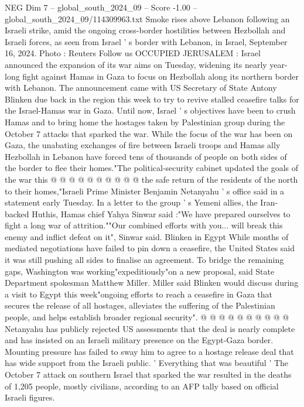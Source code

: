 \begin{textsample}{NEG Dim 7 – global\_south\_2024\_09 – Score -1.00 – global\_south\_2024\_09/114309963.txt}  \label{ex:f7_neg_220}
Smoke rises above Lebanon following an Israeli strike, amid the ongoing cross-border hostilities between Hezbollah and Israeli forces, as seen from Israel ' s border with Lebanon, in Israel, September 16, 2024.
Photo : Reuters Follow us OCCUPIED JERUSALEM : Israel announced the expansion of its war aims on Tuesday, widening its nearly year-long fight against Hamas in Gaza to focus on Hezbollah along its northern border with Lebanon.
The announcement came with US Secretary of State Antony Blinken due back in the region this week to try to revive stalled ceasefire talks for the Israel-Hamas war in Gaza.
Until now, Israel ' s objectives have been to crush Hamas and to bring home the hostages taken by Palestinian group during the October 7 attacks that sparked the war.
While the focus of the war has been on Gaza, the unabating exchanges of fire between Israeli troops and Hamas ally Hezbollah in Lebanon have forced tens of thousands of people on both sides of the border to flee their homes."The political-security cabinet updated the goals of the war this @ @ @ @ @ @ @ @ @ @ the safe return of the residents of the north to their homes,"Israeli Prime Minister Benjamin Netanyahu ' s office said in a statement early Tuesday.
In a letter to the group ' s Yemeni allies, the Iran-backed Huthis, Hamas chief Yahya Sinwar said :"We have prepared ourselves to fight a long war of attrition.""Our combined efforts with you... will break this enemy and inflict defeat on it", Sinwar said.
Blinken in Egypt While months of mediated negotiations have failed to pin down a ceasefire, the United States said it was still pushing all sides to finalise an agreement.
To bridge the remaining gaps, Washington was working"expeditiously"on a new proposal, said State Department spokesman Matthew Miller.
Miller said Blinken would discuss during a visit to Egypt this week"ongoing efforts to reach a ceasefire in Gaza that secures the release of all hostages, alleviates the suffering of the Palestinian people, and helps establish broader regional security". @ @ @ @ @ @ @ @ @ @ Netanyahu has publicly rejected US assessments that the deal is nearly complete and has insisted on an Israeli military presence on the Egypt-Gaza border.
Mounting pressure has failed to sway him to agree to a hostage release deal that has wide support from the Israeli public. ' Everything that was beautiful ' The October 7 attack on southern Israel that sparked the war resulted in the deaths of 1,205 people, mostly civilians, according to an AFP tally based on official Israeli figures.

\end{textsample}
